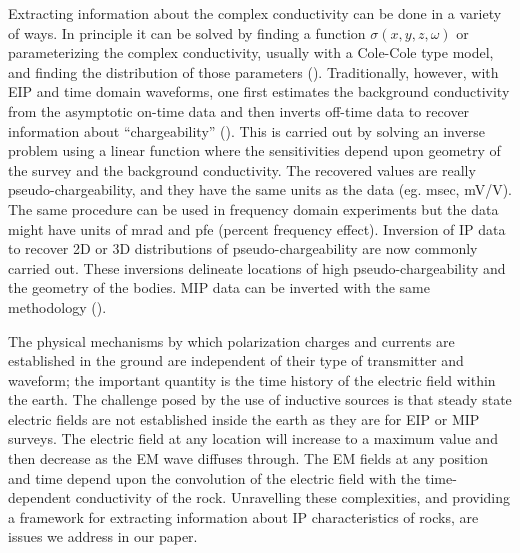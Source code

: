 \documentclass[extra,mreferee]{gji}
\begin{document}
Extracting information about the complex conductivity can be done in a variety of ways. In principle it can be solved by finding a function $\sigma(x,y,z,\omega)$ or parameterizing the complex conductivity, usually with a Cole-Cole type model, and finding the distribution of those parameters (\cite{Yuval1997,Hordt2006}). Traditionally, however, with EIP and time domain waveforms, one first estimates the background conductivity from the asymptotic on-time data and then inverts off-time data to recover information about ``chargeability'' (\cite{doug1994}). This is carried out by solving an inverse problem using a linear function where the sensitivities depend upon geometry of the survey and the background conductivity. The recovered values are really pseudo-chargeability, and they have the same units as the data (eg. msec, mV/V). The same procedure can be used in frequency domain experiments but the data might have units of mrad and pfe (percent frequency effect). Inversion of IP data to recover 2D or 3D distributions of pseudo-chargeability are now commonly carried out. These inversions delineate locations of high pseudo-chargeability and the geometry of the bodies. MIP data can be inverted with the same methodology (\cite{Chen2003}). 

The physical mechanisms by which polarization charges and currents are established in the ground are independent of their type of transmitter and waveform; the important quantity is the time history of the electric field within the earth. The challenge posed by the use of  inductive sources is that steady state electric fields are not established inside the earth as they are for EIP or MIP surveys. The electric field at any location will increase to a maximum value and then decrease as the EM wave diffuses through. The EM fields at any position and time depend upon the convolution of the electric field with the time-dependent conductivity of the rock. Unravelling these complexities, and providing a framework for extracting information about IP characteristics of rocks, are issues we address in our paper. 
\end{document}
